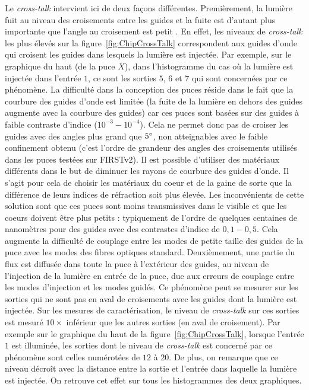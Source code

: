 Le \textit{cross-talk} intervient ici de deux façons différentes. Premièrement, la lumière fuit au niveau des croisements entre les guides et la fuite est d'autant plus importante que l'angle au croisement est petit \citep{labeye2008}. En effet, les niveaux de \textit{cross-talk} les plus élevés sur la figure~\ref{fig:ChipCrossTalk} correspondent aux guides d'onde qui croisent les guides dans lesquels la lumière est injectée. Par exemple, sur le graphique du haut (de la puce $X$), dans l'histogramme du cas où la lumière est injectée dans l'entrée $1$, ce sont les sorties $5$, $6$ et $7$ qui sont concernées par ce phénomène. La difficulté dans la conception des puces réside dans le fait que la courbure des guides d'onde est limitée (la fuite de la lumière en dehors des guides augmente avec la courbure des guides) car ces puces sont basées sur des guides à faible contraste d'indice ($10^{-3} - 10^{-4}$). Cela ne permet donc pas de croiser les guides avec des angles plus grand que $5^{\circ}$, non atteignables avec le faible confinement obtenu (c'est l'ordre de grandeur des angles des croisements utilisés dans les puces testées sur \ac{FIRSTv2}). Il est possible d'utiliser des matériaux différents dans le but de diminuer les rayons de courbure des guides d'onde. Il s'agit pour cela de choisir les matériaux du coeur et de la gaine de sorte que la différence de leurs indices de réfraction soit plus élevée. Les inconvénients de cette solution sont que ces puces sont moins transmissives dans le visible et que les coeurs doivent être plus petits : typiquement de l'ordre de quelques centaines de nanomètres pour des guides avec des contrastes d'indice de $0,1 - 0,5$. Cela augmente la difficulté de couplage entre les modes de petite taille des guides de la puce avec les modes des fibres optiques standard. Deuxièmement, une partie du flux est diffusée dans toute la puce à l'extérieur des guides, au niveau de l'injection de la lumière en entrée de la puce, due aux erreurs de couplage entre les modes d'injection et les modes guidés. Ce phénomène peut se mesurer sur les sorties qui ne sont pas en aval de croisements avec les guides dont la lumière est injectée. Sur les mesures de caractérisation, le niveau de \textit{cross-talk} sur ces sorties est mesuré $10 \times$ inférieur que les autres sorties (en aval de croisement). Par exemple sur le graphique du haut de la figure~\ref{fig:ChipCrossTalk}, lorsque l'entrée $1$ est illuminée, les sorties dont le niveau de \textit{cross-talk} est concerné par ce phénomène sont celles numérotées de $12$ à $20$. De plus, on remarque que ce niveau décroît avec la distance entre la sortie et l'entrée dans laquelle la lumière est injectée. On retrouve cet effet sur tous les histogrammes des deux graphiques.

